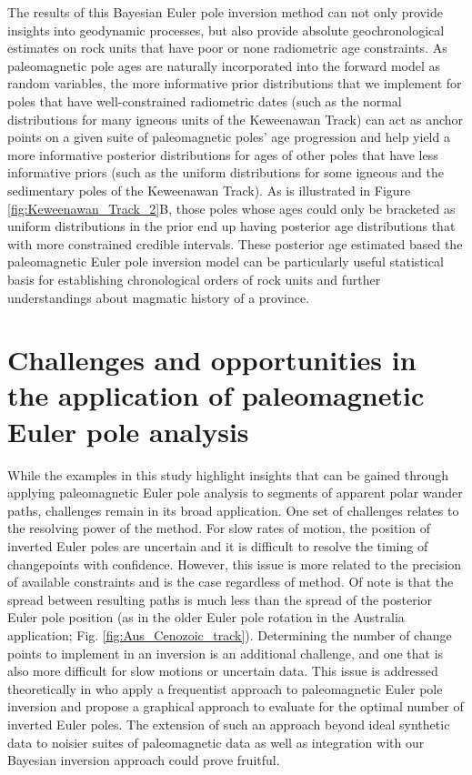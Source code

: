 \documentclass[11pt,letterpaper]{article}
\begin{document}
The results of this Bayesian Euler pole inversion method can not only provide insights into geodynamic processes, but also provide absolute geochronological estimates on rock units that have poor or none radiometric age constraints. As paleomagnetic pole ages are naturally incorporated into the forward model as random variables, the more informative prior distributions that we implement for poles that have well-constrained radiometric dates (such as the normal distributions for many igneous units of the Keweenawan Track) can act as anchor points on a given suite of paleomagnetic poles' age progression and help yield a more informative posterior distributions for ages of other poles that have less informative priors (such as the uniform distributions for some igneous and the sedimentary poles of the Keweenawan Track). As is illustrated in Figure \ref{fig:Keweenawan_Track_2}B, those poles whose ages could only be bracketed as uniform distributions in the prior end up having posterior age distributions that with more constrained credible intervals. These posterior age estimated based the paleomagnetic Euler pole inversion model can be particularly useful statistical basis for establishing chronological orders of rock units and further understandings about magmatic history of a province. 

\section*{Challenges and opportunities in the application of paleomagnetic Euler pole analysis}
\label{sec:challenges_and_opportunities}

While the examples in this study highlight insights that can be gained through applying paleomagnetic Euler pole analysis to segments of apparent polar wander paths, challenges remain in its broad application. One set of challenges relates to the resolving power of the method. For slow rates of motion, the position of inverted Euler poles are uncertain and it is difficult to resolve the timing of changepoints with confidence. However, this issue is more related to the precision of available constraints and is the case regardless of method. Of note is that the spread between resulting paths is much less than the spread of the posterior Euler pole position (as in the older Euler pole rotation in the Australia application; Fig. \ref{fig:Aus_Cenozoic_track}). Determining the number of change points to implement in an inversion is an additional challenge, and one that is also more difficult for slow motions or uncertain data. This issue is addressed theoretically in \cite{Gallo2021a} who apply a frequentist approach to paleomagnetic Euler pole inversion and propose a graphical approach to evaluate for the optimal number of inverted Euler poles. The extension of such an approach beyond ideal synthetic data to noisier suites of paleomagnetic data as well as integration with our Bayesian inversion approach could prove fruitful. 
\end{document}
